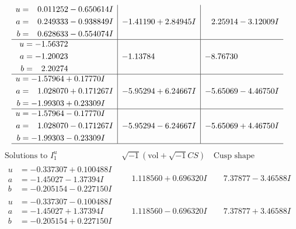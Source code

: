 \documentclass[1p]{elsarticle_modified}
\theoremstyle{definition}
\newcommand{\I}{\sqrt{-1}}
\begin{document}
$$\begin{array}{c|c|c}
\begin{aligned}
u &= \phantom{-}0.011252 - 0.650614 I \\
a &= \phantom{-}0.249333 - 0.938849 I \\
b &= \phantom{-}0.628633 - 0.554074 I\end{aligned}
 & -1.41190 + 2.84945 I & \phantom{-}2.25914 - 3.12009 I \\ \hline\begin{aligned}
u &= -1.56372\phantom{ +0.000000I} \\
a &= -1.20023\phantom{ +0.000000I} \\
b &= \phantom{-}2.20274\phantom{ +0.000000I}\end{aligned}
 & -1.13784\phantom{ +0.000000I} & -8.76730\phantom{ +0.000000I} \\ \hline\begin{aligned}
u &= -1.57964 + 0.17770 I \\
a &= \phantom{-}1.028070 + 0.171267 I \\
b &= -1.99303 + 0.23309 I\end{aligned}
 & -5.95294 + 6.24667 I & -5.65069 - 4.46750 I \\ \hline\begin{aligned}
u &= -1.57964 - 0.17770 I \\
a &= \phantom{-}1.028070 - 0.171267 I \\
b &= -1.99303 - 0.23309 I\end{aligned}
 & -5.95294 - 6.24667 I & -5.65069 + 4.46750 I\\
 \hline 
 \end{array}$$\newpage$$\begin{array}{c|c|c}  
\text{Solutions to }I^u_{1}& \I (\text{vol} + \sqrt{-1}CS) & \text{Cusp shape}\\
 \hline 
\begin{aligned}
u &= -0.337307 + 0.100488 I \\
a &= -1.45027 - 1.37394 I \\
b &= -0.205154 - 0.227150 I\end{aligned}
 & \phantom{-}1.118560 + 0.696320 I & \phantom{-}7.37877 - 3.46588 I \\ \hline\begin{aligned}
u &= -0.337307 - 0.100488 I \\
a &= -1.45027 + 1.37394 I \\
b &= -0.205154 + 0.227150 I\end{aligned}
 & \phantom{-}1.118560 - 0.696320 I & \phantom{-}7.37877 + 3.46588 I \\ \hline\begin{aligned}

\end{aligned}
\end{array}$$
\end{document}
